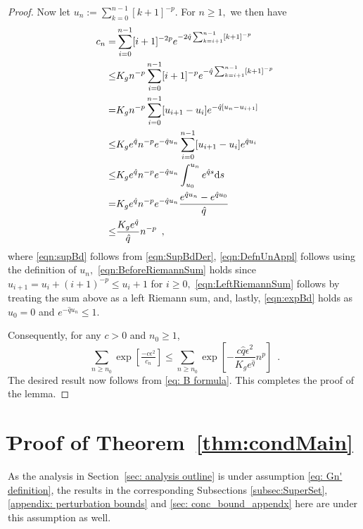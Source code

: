 \documentclass[usenames,dvipsnames,final,12pt]{colt2018} %
\newcommand{\gal}[1]{#1}
\newcommand{\gugan}[1]{#1}
\begin{document}
\begin{proof}
	\gugan{Now let $u_n := \sum_{k = 0}^{n - 1} [k+1]^{-p}.$ For $n \geq 1,$ we then have
		\begin{align}
		c_n
		= &
		\sum_{i = 0}^{n - 1} [i+1]^{-2p} e^{ -2 \hat{q} \sum_{k = i+1}^{n - 1}[k+1]^{-p}} \notag \\
		\leq & K_g n^{-p} \sum_{i = 0}^{n - 1} [i+1]^{-p} e^{ -\hat{q} \sum_{k = i+1}^{n - 1}[k+1]^{-p}} \label{eqn:supBd} \\
		= & K_g n^{-p}\sum_{i = 0}^{n - 1} [u_{i + 1} - u_i] e^{-\hat{q} [u_n - u_{i + 1}]} \label{eqn:DefnUnAppl}\\
		\leq & K_g e^{\hat{q}} n^{-p} e^{-\hat{q} u_n} \sum_{i = 0}^{n - 1} [u_{i + 1} - u_i] e^{\hat{q} u_{i}} \label{eqn:BeforeRiemannSum} \\
		\leq & K_g e^{\hat{q}} n^{-p} e^{-\hat{q} u_n}\int_{u_0}^{u_n}e^{\hat{q} s} \textnormal{d}s \label{eqn:LeftRiemannSum}\\
		= & K_g e^{\hat{q}} n^{-p} e^{-\hat{q} u_n} \frac{e^{\hat{q} u_n} - e^{\hat{q}u_0}}{\hat{q}} \notag\\
		\leq & \frac{K_g e^{\hat{q}}}{\hat{q}} n^{-p} \enspace, \label{eqn:expBd}
		\end{align}
		where \eqref{eqn:supBd} follows from \eqref{eqn:SupBdDer}, \eqref{eqn:DefnUnAppl} follows using the definition of $u_n,$ \eqref{eqn:BeforeRiemannSum} holds since $u_{i + 1} = u_i + (i + 1)^{-p} \leq u_i + 1$ for $i \geq 0,$ \eqref{eqn:LeftRiemannSum} follows by treating the sum above as a left Riemann sum, and, lastly, \eqref{eqn:expBd} holds as $u_0 = 0$ and $e^{-\hat{q} u_n} \leq 1.$}
	
	Consequently, for any $c>0$ and $n_0 \geq 1$,
	\[
	\sum_{n \geq n_0} \exp\!\left[\tfrac{-c \epsilon^2}{c_n}\right]
	\leq
	\sum_{n \geq n_0} \exp\!\left[{-\frac{c\hat{q} \epsilon^2}{K_g e^{\hat{q}}} n^p}\right] \enspace.
	\]
	The desired result now follows from \eqref{eq: B formula}.
	This completes the proof of the lemma.
\end{proof}

\section{ֿ\gal{Proof of Theorem~\ref{thm:condMain}}}
\label{sec:SupMat}
 \gal{As the analysis in Section~\ref{sec: analysis outline} is under assumption \eqref{eq: Gn' definition}, the results in the corresponding Subsections \ref{subsec:SuperSet}, \ref{appendix: perturbation bounds} and \ref{sec: conc_bound_appendx} here are under this assumption as well.}
\end{document}
